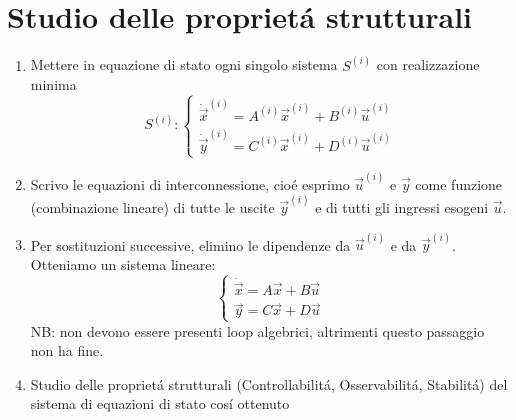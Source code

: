 \documentclass[../main.tex]{subfiles}
\begin{document}
	\section{Studio delle propriet\'a strutturali}
		\begin{enumerate}
			\item 
				Mettere in equazione di stato ogni singolo sistema $ S^{(i)} $ con realizzazione minima
				\[
					S^{(i)}:
					\begin{cases}
						\dot{\vec x}^{(i)} = A^{(i)} \vec x^{(i)} + B^{(i)} \vec u^{(i)}\\
						\dot{\vec y}^{(i)} = C^{(i)} \vec x^{(i)} + D^{(i)} \vec u^{(i)}
					\end{cases}
				\]
			\item 
				Scrivo le equazioni di interconnessione, cio\'e esprimo $ \vec u^{(i)} $ e $ \vec y $ come funzione (combinazione lineare) di tutte le uscite $ \vec y^{(i)} $ e di tutti gli ingressi esogeni $ \vec u $.
			\item 
				Per sostituzioni successive, elimino le dipendenze da $ \vec u^{(i)} $ e da $ \vec y^{(i)} $. Otteniamo un sistema lineare:
				\[
					\begin{cases}
						\dot{\vec x} = A \vec x + B \vec u\\
						\vec y = C \vec x + D \vec u
					\end{cases}
				\]
				NB: non devono essere presenti loop algebrici, altrimenti questo passaggio non ha fine.
			\item 
				Studio delle propriet\'a strutturali (Controllabilit\'a, Osservabilit\'a, Stabilit\'a) del sistema di equazioni di stato cos\'i ottenuto
		\end{enumerate}
	
\end{document}
